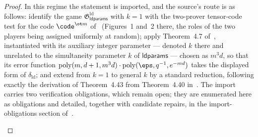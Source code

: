 \begin{proof}
	In this regime the statement is imported, and the source's route is as follows: identify the game $\mathfrak{G}^{\mathrm{ld}}_{\mathsf{ldparams}}$ with $k = 1$ with the two-prover tensor-code test for the code $\code^{\ot m}$ of~\cite{Ji2021Quantum} (Figures~1 and~2 there, the roles of the two players being assigned uniformly at random); apply Theorem~4.7 of~\cite{Ji2021Quantum}, instantiated with its auxiliary integer parameter --- denoted $k$ there and unrelated to the simultaneity parameter $k$ of $\mathsf{ldparams}$ --- chosen as $m^3 d$, so that its error function $\mathrm{poly}(m, d+1, m^3d) \cdot \mathrm{poly}(\eps, q^{-1}, e^{-md})$ takes the displayed form of $\delta_{\mathrm{ld}}$; and extend from $k = 1$ to general $k$ by a standard reduction, following exactly the derivation of Theorem~4.43 from Theorem~4.40 in~\cite{Natarajan2018NEEXP}. The import carries two verification obligations, which remain open; they are enumerated here as obligations and detailed, together with candidate repairs, in the import-obligations section of~\cite{gap:qpbt_ld-dimension-divisibility}.
	\begin{enumerate}

\end{enumerate}
\end{proof}
